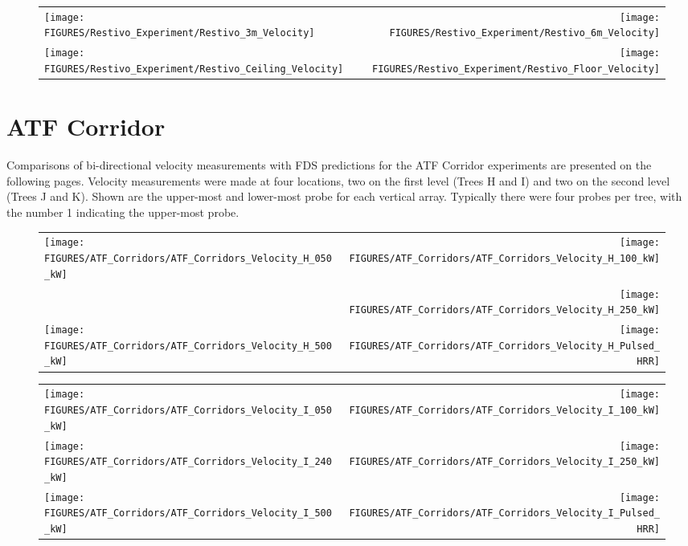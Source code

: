 \begin{figure}[h!]
\begin{tabular*}{\textwidth}{l@{\extracolsep{\fill}}r}
\texttt{[image: FIGURES/Restivo\_Experiment/Restivo\_3m\_Velocity]} &
\texttt{[image: FIGURES/Restivo\_Experiment/Restivo\_6m\_Velocity]} \\
\texttt{[image: FIGURES/Restivo\_Experiment/Restivo\_Ceiling\_Velocity]} &
\texttt{[image: FIGURES/Restivo\_Experiment/Restivo\_Floor\_Velocity]}
\end{tabular*}
\label{Restivo_Velocity}
\end{figure}

\clearpage

\section{ATF Corridor}

Comparisons of bi-directional velocity measurements with FDS predictions for the ATF Corridor experiments are presented on the following
pages. Velocity measurements were made at four locations, two on the first level (Trees H and I) and two on the second level (Trees J and K).
Shown are the upper-most and lower-most probe for each vertical array. Typically there were four probes per tree, with the number 1 indicating the
upper-most probe.

\begin{figure}[p]
\begin{tabular*}{\textwidth}{l@{\extracolsep{\fill}}r}
\texttt{[image: FIGURES/ATF\_Corridors/ATF\_Corridors\_Velocity\_H\_050\_kW]} &
\texttt{[image: FIGURES/ATF\_Corridors/ATF\_Corridors\_Velocity\_H\_100\_kW]} \\
 &
\texttt{[image: FIGURES/ATF\_Corridors/ATF\_Corridors\_Velocity\_H\_250\_kW]} \\
\texttt{[image: FIGURES/ATF\_Corridors/ATF\_Corridors\_Velocity\_H\_500\_kW]} &
\texttt{[image: FIGURES/ATF\_Corridors/ATF\_Corridors\_Velocity\_H\_Pulsed\_HRR]}
\end{tabular*}
\label{ATF_Velocity_H}
\end{figure}

\begin{figure}[p]
\begin{tabular*}{\textwidth}{l@{\extracolsep{\fill}}r}
\texttt{[image: FIGURES/ATF\_Corridors/ATF\_Corridors\_Velocity\_I\_050\_kW]} &
\texttt{[image: FIGURES/ATF\_Corridors/ATF\_Corridors\_Velocity\_I\_100\_kW]} \\
\texttt{[image: FIGURES/ATF\_Corridors/ATF\_Corridors\_Velocity\_I\_240\_kW]} &
\texttt{[image: FIGURES/ATF\_Corridors/ATF\_Corridors\_Velocity\_I\_250\_kW]} \\
\texttt{[image: FIGURES/ATF\_Corridors/ATF\_Corridors\_Velocity\_I\_500\_kW]} &
\texttt{[image: FIGURES/ATF\_Corridors/ATF\_Corridors\_Velocity\_I\_Pulsed\_HRR]}
\end{tabular*}
\label{ATF_Velocity_I}
\end{figure}

